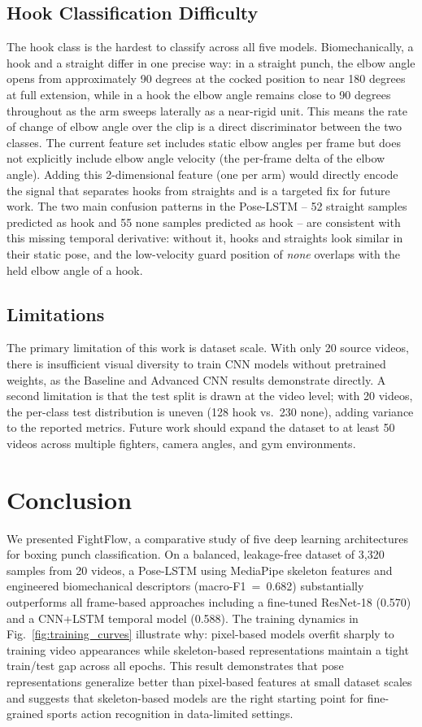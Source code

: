\documentclass[conference]{IEEEtran}
\begin{document}
\subsection{Hook Classification Difficulty}
The hook class is the hardest to classify across all five models.
Biomechanically, a hook and a straight differ in one precise way: in a
straight punch, the elbow angle opens from approximately 90 degrees at the
cocked position to near 180 degrees at full extension, while in a hook the
elbow angle remains close to 90 degrees throughout as the arm sweeps
laterally as a near-rigid unit. This means the rate of change of elbow angle
over the clip is a direct discriminator between the two classes. The current
feature set includes static elbow angles per frame but does not explicitly
include elbow angle velocity (the per-frame delta of the elbow angle). Adding
this 2-dimensional feature (one per arm) would directly encode the signal that
separates hooks from straights and is a targeted fix for future work. The two
main confusion patterns in the Pose-LSTM -- 52 straight samples predicted as
hook and 55 none samples predicted as hook -- are consistent with this missing
temporal derivative: without it, hooks and straights look similar in their
static pose, and the low-velocity guard position of \textit{none} overlaps
with the held elbow angle of a hook.

\subsection{Limitations}
The primary limitation of this work is dataset scale. With only 20 source
videos, there is insufficient visual diversity to train CNN models without
pretrained weights, as the Baseline and Advanced CNN results demonstrate
directly. A second limitation is that the test split is drawn at the video
level; with 20 videos, the per-class test distribution is uneven (128 hook
vs.\ 230 none), adding variance to the reported metrics. Future work should
expand the dataset to at least 50 videos across multiple fighters, camera
angles, and gym environments.

\section{Conclusion}

We presented FightFlow, a comparative study of five deep learning architectures
for boxing punch classification. On a balanced, leakage-free dataset of 3,320
samples from 20 videos, a Pose-LSTM using MediaPipe skeleton features and
engineered biomechanical descriptors (macro-F1~=~0.682) substantially
outperforms all frame-based approaches including a fine-tuned ResNet-18
(0.570) and a CNN+LSTM temporal model (0.588). The training dynamics in
Fig.~\ref{fig:training_curves} illustrate why: pixel-based models overfit
sharply to training video appearances while skeleton-based representations
maintain a tight train/test gap across all epochs. This result demonstrates
that pose representations generalize better than pixel-based features at small
dataset scales and suggests that skeleton-based models are the right starting
point for fine-grained sports action recognition in data-limited settings.
\end{document}
